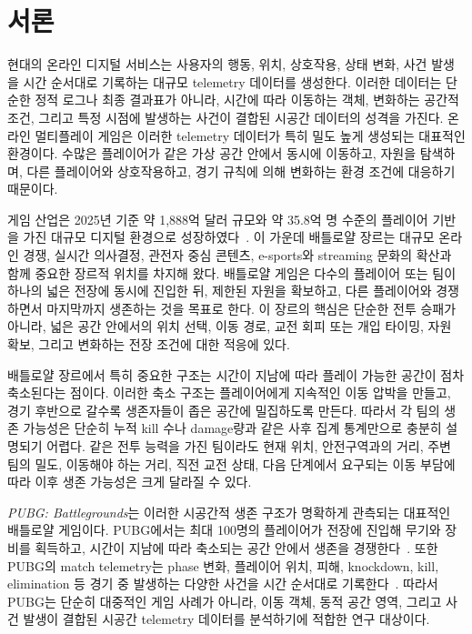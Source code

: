 \section{서론}

현대의 온라인 디지털 서비스는 사용자의 행동, 위치, 상호작용, 상태 변화, 사건 발생을 시간 순서대로 기록하는 대규모 telemetry 데이터를 생성한다. 이러한 데이터는 단순한 정적 로그나 최종 결과표가 아니라, 시간에 따라 이동하는 객체, 변화하는 공간적 조건, 그리고 특정 시점에 발생하는 사건이 결합된 시공간 데이터의 성격을 가진다. 온라인 멀티플레이 게임은 이러한 telemetry 데이터가 특히 밀도 높게 생성되는 대표적인 환경이다. 수많은 플레이어가 같은 가상 공간 안에서 동시에 이동하고, 자원을 탐색하며, 다른 플레이어와 상호작용하고, 경기 규칙에 의해 변화하는 환경 조건에 대응하기 때문이다.

게임 산업은 2025년 기준 약 1,888억 달러 규모와 약 35.8억 명 수준의 플레이어 기반을 가진 대규모 디지털 환경으로 성장하였다~\cite{newzoo2025globalgames}. 이 가운데 배틀로얄 장르는 대규모 온라인 경쟁, 실시간 의사결정, 관전자 중심 콘텐츠, e-sports와 streaming 문화의 확산과 함께 중요한 장르적 위치를 차지해 왔다. 배틀로얄 게임은 다수의 플레이어 또는 팀이 하나의 넓은 전장에 동시에 진입한 뒤, 제한된 자원을 확보하고, 다른 플레이어와 경쟁하면서 마지막까지 생존하는 것을 목표로 한다. 이 장르의 핵심은 단순한 전투 승패가 아니라, 넓은 공간 안에서의 위치 선택, 이동 경로, 교전 회피 또는 개입 타이밍, 자원 확보, 그리고 변화하는 전장 조건에 대한 적응에 있다.

배틀로얄 장르에서 특히 중요한 구조는 시간이 지남에 따라 플레이 가능한 공간이 점차 축소된다는 점이다. 이러한 축소 구조는 플레이어에게 지속적인 이동 압박을 만들고, 경기 후반으로 갈수록 생존자들이 좁은 공간에 밀집하도록 만든다. 따라서 각 팀의 생존 가능성은 단순히 누적 kill 수나 damage량과 같은 사후 집계 통계만으로 충분히 설명되기 어렵다. 같은 전투 능력을 가진 팀이라도 현재 위치, 안전구역과의 거리, 주변 팀의 밀도, 이동해야 하는 거리, 직전 교전 상태, 다음 단계에서 요구되는 이동 부담에 따라 이후 생존 가능성은 크게 달라질 수 있다.

\textit{PUBG: Battlegrounds}는 이러한 시공간적 생존 구조가 명확하게 관측되는 대표적인 배틀로얄 게임이다. PUBG에서는 최대 100명의 플레이어가 전장에 진입해 무기와 장비를 획득하고, 시간이 지남에 따라 축소되는 공간 안에서 생존을 경쟁한다~\cite{pubgGameInfo}. 또한 PUBG의 match telemetry는 phase 변화, 플레이어 위치, 피해, knockdown, kill, elimination 등 경기 중 발생하는 다양한 사건을 시간 순서대로 기록한다~\cite{pubgTelemetryEvents}. 따라서 PUBG는 단순히 대중적인 게임 사례가 아니라, 이동 객체, 동적 공간 영역, 그리고 사건 발생이 결합된 시공간 telemetry 데이터를 분석하기에 적합한 연구 대상이다.

